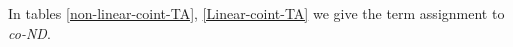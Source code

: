 
\vspace{1ex}

\noindent
In tables \ref{non-linear-coint-TA}, \ref{Linear-coint-TA} we give the term assignment to {\it co-ND}.


